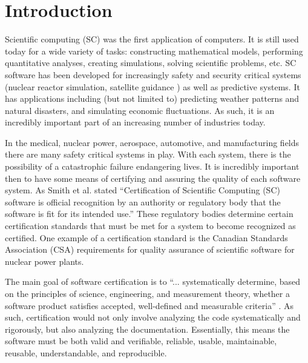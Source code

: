 \documentclass[10pt, preprint]{sigplanconf}
\begin{document}
\section{Introduction} 

Scientific computing (SC) was the first application of computers. It is still
used today for a wide variety of tasks: constructing mathematical models,
performing quantitative analyses, creating simulations, solving scientific
problems, etc. SC software has been developed for increasingly safety and
security critical systems (nuclear reactor simulation, satellite
guidance%
) as well as predictive
systems. %
It has applications including (but not limited to) predicting weather patterns
and natural disasters, and simulating economic fluctuations. As such, it is an
incredibly important part of an increasing number of industries
today.%

In the medical, nuclear power, aerospace, automotive, and manufacturing fields
there are many safety critical systems in play. With each system, there is the
possibility of a catastrophic failure endangering lives. It is incredibly
important then to have some means of certifying and assuring the quality of each
software system. As Smith et al. \cite{SmithKoothoorAndNedialkov2014} stated
``Certification of Scientiﬁc Computing (SC) software is official recognition by
an authority or regulatory body that the software is ﬁt for its intended use.''
These regulatory bodies determine certain certification standards that must be
met for a system to become recognized as certified. One example of a
certification standard is the Canadian Standards Association (CSA) requirements
for quality assurance of scientific software for nuclear power plants.

The main goal of software certification is to ``... systematically determine,
based on the principles of science, engineering, and measurement theory, whether
a software product satisfies accepted, well-defined and measurable criteria''
\cite{HHLMWW}. As such, certification would not only involve analyzing the code
systematically and rigorously, but also analyzing the
documentation. Essentially, this means the software must be both valid and
verifiable, reliable, usable, maintainable, reusable, understandable, and
reproducible. %
\end{document}
